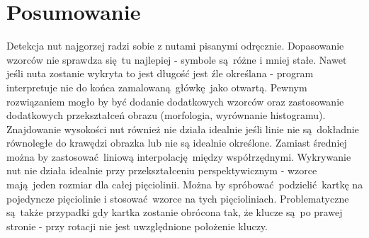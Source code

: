 \documentclass[12pt]{article}
\begin{document}
	\section{Posumowanie}
		Detekcja nut najgorzej radzi sobie z nutami pisanymi odręcznie. Dopasowanie wzorców nie sprawdza się tu najlepiej - symbole są różne i mniej stałe. Nawet jeśli nuta zostanie wykryta to jest długość jest źle określana - program interpretuje nie do końca zamalowaną główkę jako otwartą. Pewnym rozwiązaniem mogło by być dodanie dodatkowych wzorców oraz zastosowanie dodatkowych przekształceń obrazu (morfologia, wyrównanie histogramu). Znajdowanie wysokości nut również nie działa idealnie jeśli linie nie są dokładnie równoległe do krawędzi obrazka lub nie są idealnie określone. Zamiast średniej można by zastosować liniową interpolację między współrzędnymi. Wykrywanie nut nie działa idealnie przy przekształceniu perspektywicznym - wzorce mają jeden rozmiar dla całej pięciolinii. Można by spróbować podzielić kartkę na pojedyncze pięciolinie i stosować wzorce na tych pięcioliniach. Problematyczne są także przypadki gdy kartka zostanie obrócona tak, że klucze są po prawej stronie - przy rotacji nie jest uwzględnione położenie kluczy.
\end{document}
